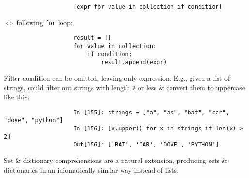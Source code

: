 \documentclass{article}
\begin{document}
\begin{enumerate}
\begin{itemize}
\begin{itemize}
\begin{itemize}
\begin{verbatim}
					[expr for value in collection if condition]
				\end{verbatim}
				$\Leftrightarrow$ following {\tt for} loop:
				\begin{verbatim}
					result = []
					for value in collection:
					    if condition:
					        result.append(expr)
				\end{verbatim}
				Filter condition can be omitted, leaving only expression. E.g., given a list of strings, could filter out strings with length {\tt 2} or less \& convert them to uppercase like this:
				\begin{verbatim}
					In [155]: strings = ["a", "as", "bat", "car", "dove", "python"]
					In [156]: [x.upper() for x in strings if len(x) > 2]
					Out[156]: ['BAT', 'CAR', 'DOVE', 'PYTHON']
				\end{verbatim}
				Set \& dictionary comprehensions are a natural extension, producing sets \& dictionaries in an idiomatically similar way instead of lists.
				

\end{itemize}
\end{itemize}
\end{itemize}
\end{enumerate}
\end{document}
